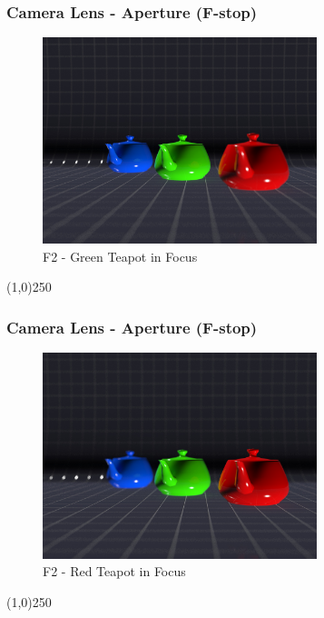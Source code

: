 \begin{frame}
\frametitle{Camera Lens - Aperture (F-stop)}
\begin{figure}
	\centering
	\includegraphics[height=6cm]{img/Camras/GreenTeapot.jpg}
	\caption[F2 - Green Teapot in Focus]{F2 - Green Teapot in Focus}
	\label{fig:GreenTeaPot}
\end{figure}
\end{frame}
\begin{center}\line(1,0){250}\end{center}


\begin{frame}
\frametitle{Camera Lens - Aperture (F-stop)}
\begin{figure}
	\centering
	\includegraphics[height=6cm]{img/Camras/RedTeapot.jpg}
	\caption[F2 - Red Teapot in Focus]{F2 - Red Teapot in Focus}
	\label{fig:BlueTeaPot}
\end{figure}
\end{frame}
\begin{center}\line(1,0){250}\end{center}







\newpage

%



%
%
\nocite{*}


\newpage

\printindex
\newpage






